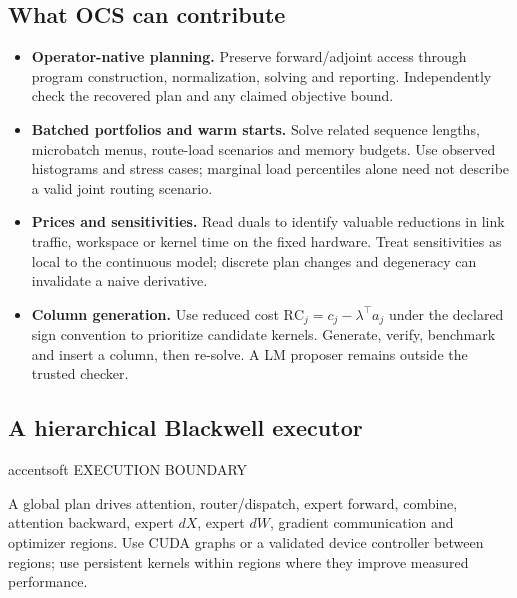 \documentclass[10pt]{article}
\newcommand{\mono}{\ttfamily}
\newenvironment{callA}{\begin{callbox}[accent]{accentsoft}}{\end{callbox}}
\newcommand{\ct}[1]{{\mono\fontsize{7.2}{8}\selectfont\color{ink2}\MakeUppercase{#1}}\par\vspace{2pt}}
\newenvironment{tight}
  {\begin{itemize}[leftmargin=13pt,itemsep=4pt,topsep=4pt,parsep=0pt,
     label=\textcolor{ink3}{\footnotesize$\bullet$}]\color{ink2}}
  {\end{itemize}}
\begin{document}
\subsection{What OCS can contribute}
\begin{tight}
\item \textbf{\color{ink}Operator-native planning.} Preserve forward/adjoint
access through program construction, normalization, solving and reporting.
Independently check the recovered plan and any claimed objective bound.
\item \textbf{\color{ink}Batched portfolios and warm starts.} Solve related
sequence lengths, microbatch menus, route-load scenarios and memory budgets.
Use observed histograms and stress cases; marginal load percentiles alone need
not describe a valid joint routing scenario.
\item \textbf{\color{ink}Prices and sensitivities.} Read duals to identify
valuable reductions in link traffic, workspace or kernel time on the fixed
hardware. Treat sensitivities as local to the continuous model; discrete plan
changes and degeneracy can invalidate a naive derivative.
\item \textbf{\color{ink}Column generation.} Use reduced cost
$\mathrm{RC}_j=c_j-\lambda^\top a_j$ under the declared sign convention to
prioritize candidate kernels. Generate, verify, benchmark and insert a column,
then re-solve. A LM proposer remains outside the trusted checker.
\end{tight}

\subsection{A hierarchical Blackwell executor}
\begin{callA}
\ct{Execution boundary}
A global plan drives attention, router/dispatch, expert forward, combine,
attention backward, expert $dX$, expert $dW$, gradient communication and optimizer
regions. Use CUDA graphs or a validated device controller between regions;
use persistent kernels within regions where they improve measured performance.
\end{callA}
\end{document}

